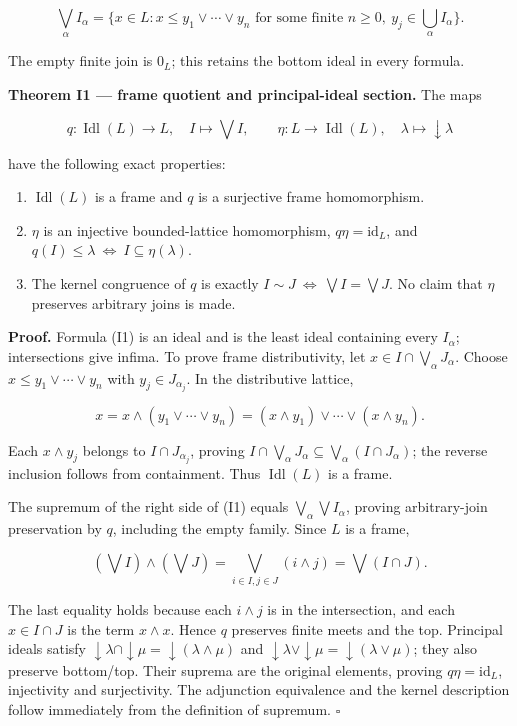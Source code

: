 \[
\bigvee_\alpha I_\alpha=
\{x\in L:x\le y_1\vee\cdots\vee y_n
\text{ for some finite }n\ge0,\ y_j\in\bigcup_\alpha I_\alpha\}.
\tag{I1}
\]

The empty finite join is \(0_L\); this retains the bottom ideal in every formula.

\textbf{Theorem I1 --- frame quotient and principal-ideal section.} The maps

\[
q:\operatorname{Idl}(L)\to L,\quad I\mapsto\bigvee I,
\qquad\eta:L\to\operatorname{Idl}(L),\quad\lambda\mapsto\downarrow\lambda
\tag{I2}
\]

have the following exact properties:

\begin{enumerate}
\def\labelenumi{\arabic{enumi}.}
\tightlist
\item
  \(\operatorname{Idl}(L)\) is a frame and \(q\) is a surjective frame homomorphism.
\item
  \(\eta\) is an injective bounded-lattice homomorphism, \(q\eta=\mathrm{id}_L\), and
  \(q(I)\le\lambda\ \Longleftrightarrow\ I\subseteq\eta(\lambda)\).
\item
  The kernel congruence of \(q\) is exactly \(I\sim J\ \Longleftrightarrow\ \bigvee I=\bigvee J\). No claim that \(\eta\) preserves arbitrary joins is made.
\end{enumerate}

\textbf{Proof.} Formula (I1) is an ideal and is the least ideal containing every \(I_\alpha\); intersections give infima. To prove frame distributivity, let \(x\in I\cap\bigvee_\alpha J_\alpha\). Choose \(x\le y_1\vee\cdots\vee y_n\) with \(y_j\in J_{\alpha _j}\). In the distributive lattice,

\[
x=x\wedge(y_1\vee\cdots\vee y_n)
=(x\wedge y_1)\vee\cdots\vee(x\wedge y_n).
\]

Each \(x\wedge y_j\) belongs to \(I\cap J_{\alpha _j}\), proving \(I\cap\bigvee_\alpha J_\alpha\subseteq\bigvee_\alpha(I\cap J_\alpha)\); the reverse inclusion follows from containment. Thus \(\operatorname{Idl}(L)\) is a frame.

The supremum of the right side of (I1) equals \(\bigvee_\alpha\bigvee I_\alpha\), proving arbitrary-join preservation by \(q\), including the empty family. Since \(L\) is a frame,

\[
(\bigvee I)\wedge(\bigvee J)
=\bigvee_{i\in I,j\in J}(i\wedge j)
=\bigvee(I\cap J).
\]

The last equality holds because each \(i\wedge j\) is in the intersection, and each \(x\in I\cap J\) is the term \(x\wedge x\). Hence \(q\) preserves finite meets and the top. Principal ideals satisfy \(\downarrow \lambda \cap \downarrow \mu =\downarrow (\lambda \wedge \mu )\) and \(\downarrow \lambda \vee \downarrow \mu =\downarrow (\lambda \vee \mu )\); they also preserve bottom/top. Their suprema are the original elements, proving \(q\eta=\mathrm{id}_L\), injectivity and surjectivity. The adjunction equivalence and the kernel description follow immediately from the definition of supremum. \(\square\)

